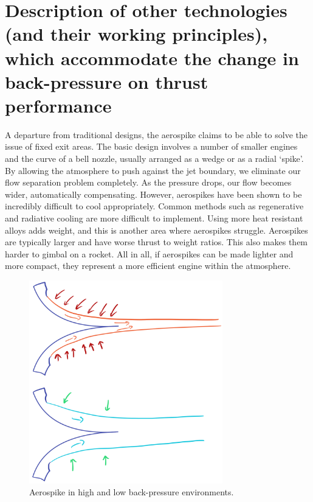 \documentclass[11pt]{article}
\numberwithin{equation}{section}
\begin{document}
\section{Description of other technologies (and their working principles), which accommodate the change in back-pressure on thrust performance}
A departure from traditional designs, the aerospike claims to be able to solve the issue of fixed exit areas. The basic design involves a number of smaller engines and the curve of a bell nozzle, usually arranged as a wedge or as a radial `spike'. By allowing the atmosphere to push against the jet boundary, we eliminate our flow separation problem completely. As the pressure drops, our flow becomes wider, automatically compensating. However, aerospikes have been shown to be incredibly difficult to cool appropriately. Common methods such as regenerative and radiative cooling are more difficult to implement. Using more heat resistant alloys adds weight, and this is another area where aerospikes struggle. Aerospikes are typically larger and have worse thrust to weight ratios. This also makes them harder to gimbal on a rocket. All in all, if aerospikes can be made lighter and more compact, they represent a more efficient engine within the atmosphere.
\begin{figure}[H]
    \centering
    \includegraphics[width = 0.75\textwidth]{./img/aerospike.png}
    \caption{Aerospike in high and low back-pressure environments.}
\end{figure}
\cite{b9}
\end{document}
